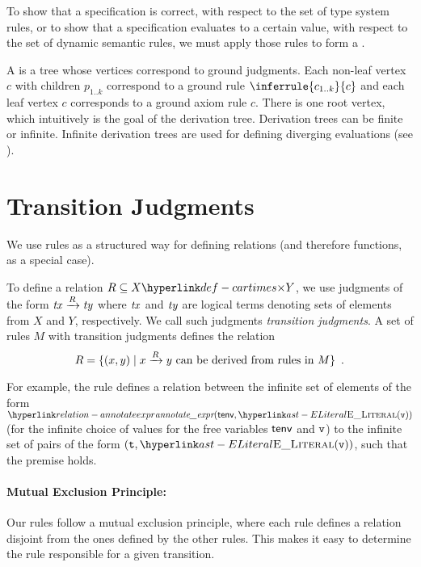 To show that a specification is correct, with respect to the set of type system rules,
or to show that a specification evaluates to a certain value, with respect to
the set of dynamic semantic rules, we must apply those rules to form a \emph{\derivationtreeterm}.

\hypertarget{def-derivationtree}{}
\begin{definition}
A \emph{\derivationtreeterm} is a tree whose vertices correspond to ground judgments.
Each non-leaf vertex $c$ with children $p_{1..k}$ correspond to a ground rule
$\inferrule{c_{1..k}}{c}$ and each leaf vertex $c$ corresponds to a ground axiom rule
$c$. There is one root vertex, which intuitively is the goal of the derivation tree.
Derivation trees can be finite or infinite.
Infinite derivation trees are used for defining diverging evaluations
(see ).
\end{definition}

\section{Transition Judgments\label{sec:Transition Judgments}}

We use rules as a structured way for defining relations (and therefore functions, as a special case).

To define a relation $R \subseteq X \cartimes Y$, we use judgments of the form $\mathit{tx} \xrightarrow{R} \mathit{ty}$
where $\mathit{tx}$ and $\mathit{ty}$ are logical terms denoting sets of elements from $X$ and $Y$, respectively.
%
We call such judgments \emph{transition judgments}.
A set of rules $M$ with transition judgments defines the relation
\[
    R = \{ (x,y) \;|\; x \xrightarrow{R} y \text{ can be derived from rules in } M\} \enspace.
\]

For example, the rule  defines a relation
between the infinite set of elements of the form
$\annotateexpr(\tenv, \ELiteral(\vv))$ (for the
infinite choice of values for the free variables $\textsf{tenv}$ and
$\texttt{v}$) to the infinite set of pairs of the form $(\vt,
\ELiteral(\vv))$, such that the premise holds.

\paragraph{Mutual Exclusion Principle:}
Our rules follow a mutual exclusion principle, where each rule
defines a relation disjoint from the ones defined by the other
rules. This makes it easy to determine the rule responsible
for a given transition.

